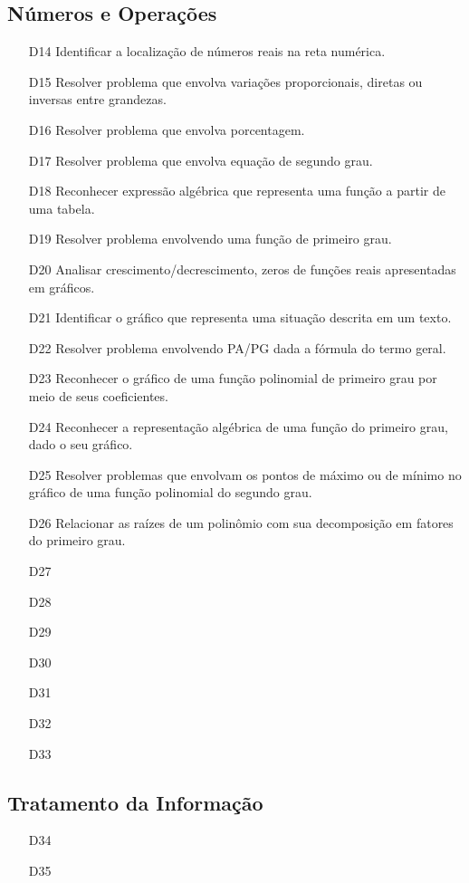 \subsection{Números e Operações}
\begin{enumerate}
    \item[D14] \label{itm3:D14} Identificar a localização de números reais na reta numérica.
    \item[D15] \label{itm3:D15} Resolver problema que envolva variações proporcionais, diretas ou inversas entre grandezas.
    \item[D16] \label{itm3:D16} Resolver problema que envolva porcentagem.
    \item[D17] \label{itm3:D17} Resolver problema que envolva equação de segundo grau.
    \item[D18] \label{itm3:D18} Reconhecer expressão algébrica que representa uma função a partir de uma tabela.
    \item[D19] \label{itm3:D19} Resolver problema envolvendo uma função de primeiro grau.
    \item[D20] \label{itm3:D20} Analisar crescimento/decrescimento, zeros de funções reais apresentadas em gráficos.
    \item[D21] \label{itm3:D21} Identificar o gráfico que representa uma situação descrita em um texto.
    \item[D22] \label{itm3:D22} Resolver problema envolvendo PA/PG dada a fórmula do termo geral.
    \item[D23] \label{itm3:D23} Reconhecer o gráfico de uma função polinomial de primeiro grau por meio de seus coeficientes.
    \item[D24] \label{itm3:D24} Reconhecer a representação algébrica de uma função do primeiro grau, dado o seu gráfico.
    \item[D25] \label{itm3:D25} Resolver problemas que envolvam os pontos de máximo ou de mínimo no gráfico de uma função polinomial do segundo grau.
    \item[D26] \label{itm3:D26} Relacionar as raízes de um polinômio com sua decomposição em fatores do primeiro grau.
    \item[D27] \label{itm3:D27} 
    \item[D28] \label{itm3:D28}
    \item[D29] \label{itm3:D29}
    \item[D30] \label{itm3:D30}
    \item[D31] \label{itm3:D31}
    \item[D32] \label{itm3:D32}
    \item[D33] \label{itm3:D33}
\end{enumerate}

\subsection{Tratamento da Informação}
\begin{enumerate}
    \item[D34] \label{itm3:D34}
    \item[D35] \label{itm3:D35}
\end{enumerate}